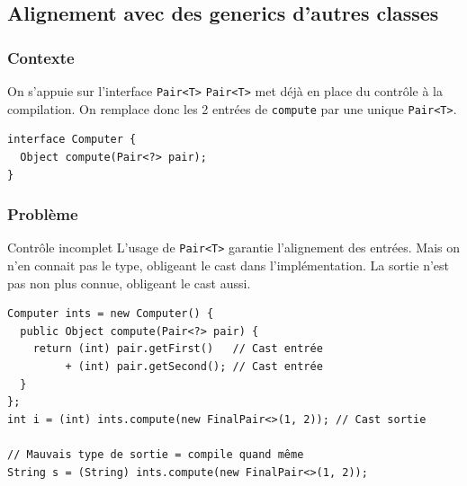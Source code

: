 \documentclass[draft]{beamer}
\begin{document}
\subsection{Alignement avec des generics d'autres classes}

\begin{frame}[fragile]
\frametitle{Contexte}
\begin{block}{On s'appuie sur l'interface \lstinline{Pair<T>}}
 \lstinline{Pair<T>} met déjà en place du contrôle à la compilation.
 On remplace donc les 2 entrées de \lstinline{compute} par une unique \lstinline{Pair<T>}.
\end{block}
\begin{lstlisting}
interface Computer {
  Object compute(Pair<?> pair);
}
\end{lstlisting}
\end{frame}

\begin{frame}[fragile]
\frametitle{Problème}
\begin{alertblock}{Contrôle incomplet}
 L'usage de \lstinline{Pair<T>} garantie l'alignement des entrées.
 Mais on n'en connait pas le type, obligeant le cast dans l'implémentation.
 La sortie n'est pas non plus connue, obligeant le cast aussi.
\end{alertblock}
\begin{lstlisting}
Computer ints = new Computer() {
  public Object compute(Pair<?> pair) {
    return (int) pair.getFirst()   // Cast entrée
         + (int) pair.getSecond(); // Cast entrée
  }
};
int i = (int) ints.compute(new FinalPair<>(1, 2)); // Cast sortie

// Mauvais type de sortie = compile quand même
String s = (String) ints.compute(new FinalPair<>(1, 2));
\end{lstlisting}
\end{frame}
\end{document}
